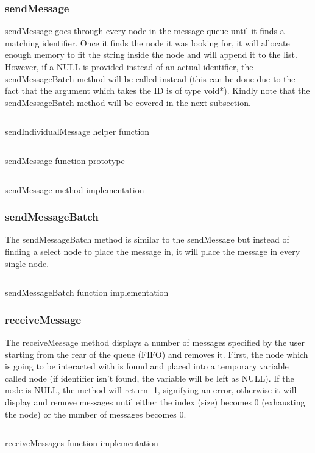\documentclass[a4paper, 12pt, titlepage]{article}
\newenvironment{code}{\captionsetup{type=listing}}{}
\newcommand{\sourcecode}[3]{
    \begin{code}
      \inputminted[linenos,numbersep=5pt,gobble=0,frame=lines,framesep=2mm,]{c}{#1}
        \caption{#2}
        \label{lst: #3}
    \end{code}
  }
\begin{document}
\begin{onehalfspacing}
  \subsubsection{sendMessage}
  sendMessage goes through every node in the message queue until it finds a matching identifier. Once it finds the node it was looking for, it will allocate enough memory to fit the string inside the node and will append it to the list. However, if a NULL is provided instead of an actual identifier, the sendMessageBatch method will be called instead (this can be done due to the fact that the argument which takes the ID is of type void*). Kindly note that the sendMessageBatch method will be covered in the next subsection.

    \sourcecode{snippets/sendIndividual.c}{sendIndividualMessage helper function}{sendInd}

  \sourcecode{snippets/sendMessage_header.c}{sendMessage function prototype}{sendMessage_header}

  \sourcecode{snippets/sendMessage.c}{sendMessage method implementation}{sendMessage}



  \subsubsection{sendMessageBatch}
  The sendMessageBatch method is similar to the sendMessage but instead of finding a select node to place the message in, it will place the message in every single node.

  \sourcecode{snippets/sendMessageBatch.c}{sendMessageBatch function implementation}{sendMessageBatch}


  \subsubsection{receiveMessage}
  The receiveMessage method displays a number of messages specified by the user starting from the rear of the queue (FIFO) and removes it. First, the node which is going to be interacted with is found and placed into a temporary variable called node (if identifier isn't found, the variable will be left as NULL). If the node is NULL, the method will return -1, signifying an error, otherwise it will display and remove messages until either the index (size) becomes 0 (exhausting the node) or the number of messages becomes 0.

  \sourcecode{snippets/receiveMessages.c}{receiveMessages function implementation}{receiveMessages}


\end{onehalfspacing}
\end{document}
